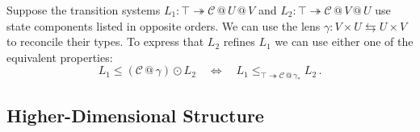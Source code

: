 \documentclass[acmsmall,screen,review,anonymous]{acmart}
\newcommand{\que}{\circ}
\newcommand{\ans}{\bullet}
\newcommand{\lensarrow}{\leftrightarrows}
\begin{document}
\begin{example}
Suppose the transition systems
$L_1 : \top \twoheadrightarrow \mathcal{C} \mathbin@ U \mathbin@ V$ and
$L_2 : \top \twoheadrightarrow \mathcal{C} \mathbin@ V \mathbin@ U$
use state components listed in opposite orders.
We can use the lens
$\gamma : V \times U \lensarrow U \times V$
to reconcile their types.
To express that $L_2$ refines $L_1$ we can
use either one of the equivalent properties:
\[
  L_1
    \le
    (\mathcal{C} \mathbin@ \gamma) \odot L_2
  \quad \Leftrightarrow \quad
  L_1
    \le_{\top \twoheadrightarrow \mathcal{C} \mathbin@ \gamma_*}
    L_2
  \,.
\]
\end{example}


%
%


\subsection{Higher-Dimensional Structure} \label{sec:overview:high-dimension} %
\end{document}
